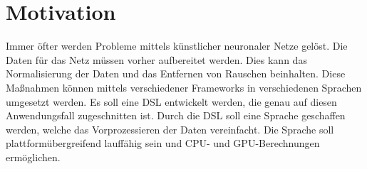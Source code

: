 
\chapter{Motivation}
\setcounter{page}{1}
Immer öfter werden Probleme mittels künstlicher neuronaler Netze gelöst.
Die Daten für das Netz müssen vorher aufbereitet werden.
Dies kann das Normalisierung der Daten und das Entfernen von Rauschen beinhalten.
Diese Maßnahmen können mittels verschiedener Frameworks in verschiedenen Sprachen umgesetzt werden.
Es soll eine \ac{DSL} entwickelt werden, die genau auf diesen Anwendungsfall zugeschnitten ist.
Durch die \ac{DSL} soll eine Sprache geschaffen werden, welche das Vorprozessieren der Daten vereinfacht.
Die Sprache soll plattformübergreifend lauffähig sein und \ac{CPU}- und \ac{GPU}-Berechnungen ermöglichen.

\endinput
